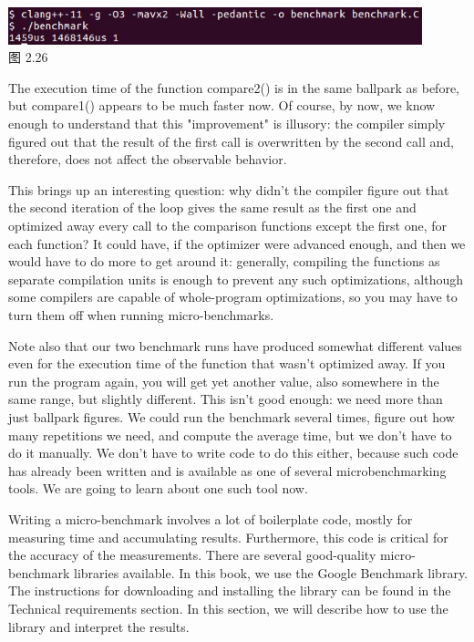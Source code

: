 \begin{center}
\includegraphics[width=0.9\textwidth]{content/1/chapter2/images/26.jpg}\\
图 2.26
\end{center}

The execution time of the function compare2() is in the same ballpark as before, but compare1() appears to be much faster now. Of course, by now, we know enough to understand that this "improvement" is illusory: the compiler simply figured out that the result of the first call is overwritten by the second call and, therefore, does not affect the observable behavior.

This brings up an interesting question: why didn't the compiler figure out that the second iteration of the loop gives the same result as the first one and optimized away every call to the comparison functions except the first one, for each function? It could have, if the optimizer were advanced enough, and then we would have to do more to get around it: generally, compiling the functions as separate compilation units is enough to prevent any such optimizations, although some compilers are capable of whole-program optimizations, so you may have to turn them off when running micro-benchmarks.

Note also that our two benchmark runs have produced somewhat different values even for the execution time of the function that wasn't optimized away. If you run the program again, you will get yet another value, also somewhere in the same range, but slightly different. This isn't good enough: we need more than just ballpark figures. We could run the benchmark several times, figure out how many repetitions we need, and compute the average time, but we don't have to do it manually. We don't have to write code to do this either, because such code has already been written and is available as one of several microbenchmarking tools. We are going to learn about one such tool now.


Writing a micro-benchmark involves a lot of boilerplate code, mostly for measuring time and accumulating results. Furthermore, this code is critical for the accuracy of the measurements. There are several good-quality micro-benchmark libraries available. In this book, we use the Google Benchmark library. The instructions for downloading and installing the library can be found in the Technical requirements section. In this section, we will describe how to use the library and interpret the results.

